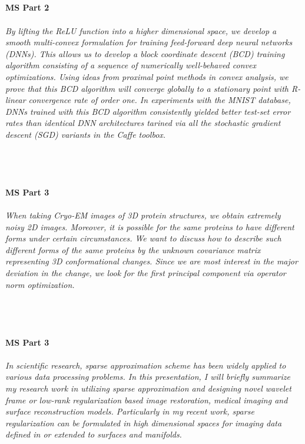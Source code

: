 \begin{multicols}{2}
\\ 
    \\
    \\\\
    \noindent\textbf{MS Part 2}\\
\\  
    \textit{By lifting the ReLU function into a higher dimensional space, we develop a smooth multi-convex formulation for training feed-forward deep neural networks (DNNs). This allows us to develop a block coordinate descent (BCD) training algorithm consisting of a sequence of numerically well-behaved convex optimizations. Using ideas from proximal point methods in convex analysis, we prove that this BCD algorithm will converge globally to a stationary point with R-linear convergence rate of order one. In experiments with the MNIST database, DNNs trained with this BCD algorithm consistently yielded better test-set error rates than identical DNN architectures tarined via all the stochastic gradient descent (SGD) variants in the Caffe toolbox.}\\
\\ 
    \\
    \\\\
    \noindent\textbf{MS Part 3}\\
\\  
    \textit{When taking Cryo-EM images of 3D protein structures, we obtain extremely noisy 2D images. Moreover, it is possible for the same proteins to have different forms under certain circumstances. We want to discuss how to describe such different forms of the same proteins by the unknown covariance matrix representing 3D conformational changes. Since we are most interest in the major deviation in the change, we look for the first principal component via operator norm optimization.}\\
\\ 
    \\
    \\\\
    \noindent\textbf{MS Part 3}\\
\\  
    \textit{In scientific research, sparse approximation scheme has been widely applied to various data processing problems. In this presentation, I will briefly summarize my research work in utilizing sparse approximation and designing novel wavelet frame or low-rank regularization based image restoration, medical imaging and surface reconstruction models. Particularly in my recent work, sparse regularization can be formulated in high dimensional spaces for imaging data defined in or extended to surfaces and manifolds.}\\

\end{multicols}

